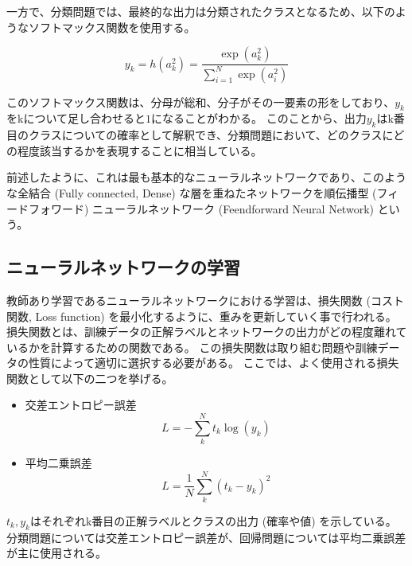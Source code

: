 一方で、分類問題では、最終的な出力は分類されたクラスとなるため、以下のようなソフトマックス関数を使用する。

\begin{equation}
 y_k = h(a^2_k) = \frac{\exp{(a^2_k)}}{\sum^N_{i=1}\exp{(a^2_i)}}
\end{equation}

このソフトマックス関数は、分母が総和、分子がその一要素の形をしており、$y_k$をkについて足し合わせると$1$になることがわかる。
このことから、出力$y_k$はk番目のクラスについての確率として解釈でき、分類問題において、どのクラスにどの程度該当するかを表現することに相当している。

前述したように、これは最も基本的なニューラルネットワークであり、このような全結合 (Fully connected, Dense) な層を重ねたネットワークを順伝播型 (フィードフォワード) ニューラルネットワーク (Feendforward Neural Network) という。


\subsection{ニューラルネットワークの学習} \label{DL:NN:TrainingofNN}


教師あり学習であるニューラルネットワークにおける学習は、損失関数 (コスト関数, Loss function) を最小化するように、重みを更新していく事で行われる。
損失関数とは、訓練データの正解ラベルとネットワークの出力がどの程度離れているかを計算するための関数である。
この損失関数は取り組む問題や訓練データの性質によって適切に選択する必要がある。
ここでは、よく使用される損失関数として以下の二つを挙げる。
\begin{itemize}
  \item 交差エントロピー誤差
\begin{equation}
 L = - \sum^N_k t_k \log{(y_k)}
\end{equation}
  \item 平均二乗誤差
\begin{equation}
 L = \frac{1}{N} \sum^N_k(t_k - y_k)^2
\end{equation}
\end{itemize}
$t_k, y_k$はそれぞれk番目の正解ラベルとクラスの出力 (確率や値) を示している。
分類問題については交差エントロピー誤差が、回帰問題については平均二乗誤差が主に使用される。

